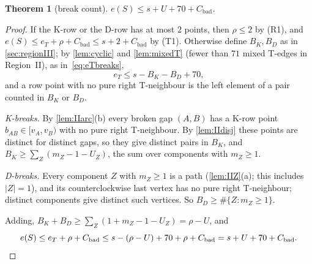 \documentclass[11pt]{amsart}
\newtheorem{theorem}{Theorem}[section]
\theoremstyle{definition}
\theoremstyle{remark}
\begin{document}
\begin{theorem}[break count]\label{thm:IIBC}
$e(S)\le s+U+70+C_{\mathrm{bad}}$.
\end{theorem}
\begin{proof}
If the K-row or the D-row has at most $2$ points, then $\rho\le2$ by (R1), and $e(S)\le e_T+\rho+C_{\mathrm{bad}}\le s+2+C_{\mathrm{bad}}$ by (T1). Otherwise define $B_K,B_D$ as in \cref{sec:regionIII}; by \cref{lem:cyclic} and \cref{lem:mixedT} (fewer than $71$ mixed T-edges in Region~II), as in~\eqref{eq:eTbreaks},
\[
e_T\le s-B_K-B_D+70,
\]
and a row point with no pure right T-neighbour is the left element of a pair counted in $B_K$ or $B_D$.

\emph{K-breaks.} By \cref{lem:IIarc}(b) every broken gap $(A,B)$ has a K-row point $b_{AB}\in[v_A,v_B)$ with no pure right T-neighbour. By \cref{lem:IIdisj} these points are distinct for distinct gaps, so they give distinct pairs in $B_K$, and $B_K\ge\sum_Z(m_Z-1-U_Z)$, the sum over components with $m_Z\ge1$.

\emph{D-breaks.} Every component $Z$ with $m_Z\ge1$ is a path (\cref{lem:IIZ}(a); this includes $|Z|=1$), and its counterclockwise last vertex has no pure right T-neighbour; distinct components give distinct such vertices. So $B_D\ge\#\{Z:m_Z\ge1\}$.

Adding, $B_K+B_D\ge\sum_Z(1+m_Z-1-U_Z)=\rho-U$, and
\[
e(S)\le e_T+\rho+C_{\mathrm{bad}}\le s-(\rho-U)+70+\rho+C_{\mathrm{bad}}=s+U+70+C_{\mathrm{bad}}.\qedhere
\]
\end{proof}
\end{document}
